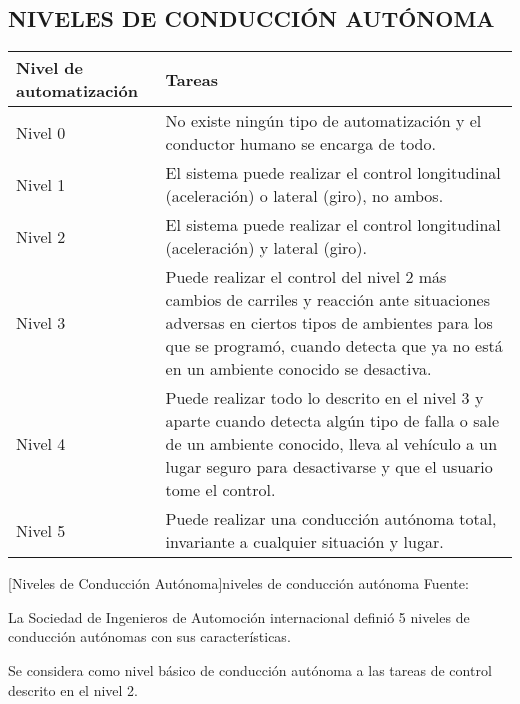 	\subsection{NIVELES DE CONDUCCIÓN AUTÓNOMA}
	\begingroup
	\begin{center}
		\footnotesize
		\begin{tabularx}{\textwidth}{|l|X|}
			\hline
			\textbf{Nivel de automatización} & \textbf{Tareas} \\
			\hline
			Nivel 0 & No existe ningún tipo de automatización y el conductor humano se encarga de todo. \\
			\hline
			Nivel 1 & El sistema puede realizar el control longitudinal (aceleración) o lateral (giro), no ambos. \\
			\hline
			Nivel 2 & El sistema puede realizar el control longitudinal (aceleración) y lateral (giro). \\
			\hline
			Nivel 3 & Puede realizar el control del nivel 2 más cambios de carriles y reacción ante situaciones adversas en ciertos tipos de ambientes para los que se programó, cuando detecta que ya no está en un ambiente conocido se desactiva. \\
			\hline
			Nivel 4 & Puede realizar todo lo descrito en el nivel 3 y aparte cuando detecta algún tipo de falla o sale de un ambiente conocido, lleva al vehículo a un lugar seguro para desactivarse y que el usuario tome el control. \\
			\hline
			Nivel 5 & Puede realizar una conducción autónoma total, invariante a cualquier situación y lugar. \\
			\hline
		\end{tabularx}
		 
		[Niveles de Conducción Autónoma]{niveles de conducción autónoma Fuente:\citep{J3016_201806}}\label{niveles}
	\end{center}
	\endgroup
	\vspace{-4mm}	
	La Sociedad de Ingenieros de Automoción internacional definió 5 niveles de conducción autónomas con sus características.
	
	Se considera como nivel básico de conducción autónoma a las tareas de control descrito en el nivel 2.